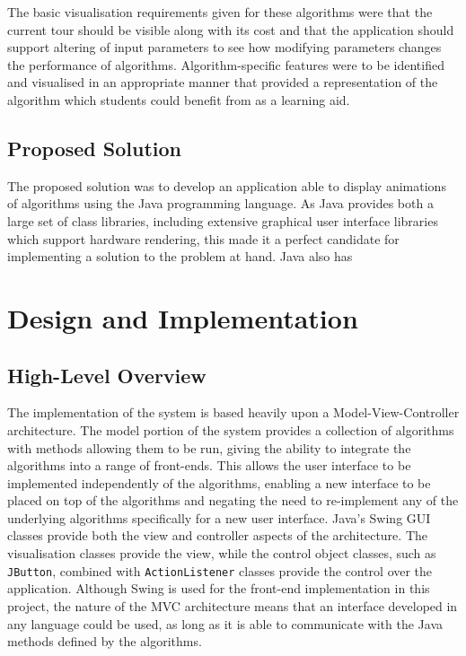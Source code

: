 \documentclass{l4proj}
\begin{document}
The basic visualisation requirements given for these algorithms were that the current tour should be visible along with its cost and 
that the application should support altering of input parameters to see how modifying parameters changes the performance of algorithms. 
Algorithm-specific features were to be identified and visualised in an appropriate manner that provided a representation of the 
algorithm which students could benefit from as a learning aid.

\section{Proposed Solution}
The proposed solution was to develop an application able to display animations of algorithms using the Java programming 
language. As Java provides both a large set of class libraries, including extensive graphical user interface libraries which 
support hardware rendering, this made it a perfect candidate for implementing a solution to the problem at hand. Java also has 


\chapter{Design and Implementation}
\label{design}

\section{High-Level Overview}
The implementation of the system is based heavily upon a Model-View-Controller architecture. The model portion of the system provides 
a collection of algorithms with methods allowing them to be run, giving the ability to integrate the algorithms into a range of front-ends. 
This allows the user interface to be implemented independently of the algorithms, enabling a new interface to be placed on top of the algorithms 
and negating the need to re-implement any of the underlying algorithms specifically for a new user interface. Java's Swing GUI classes 
provide both the view and controller aspects of the architecture. The visualisation classes provide the view, while the control object classes, 
such as \texttt{JButton}, combined with \texttt{ActionListener} classes provide the control over the application. Although Swing is used for 
the front-end implementation in this project, the nature of the MVC architecture means that an interface developed in any language could be 
used, as long as it is able to communicate with the Java methods defined by the algorithms.
\end{document}
